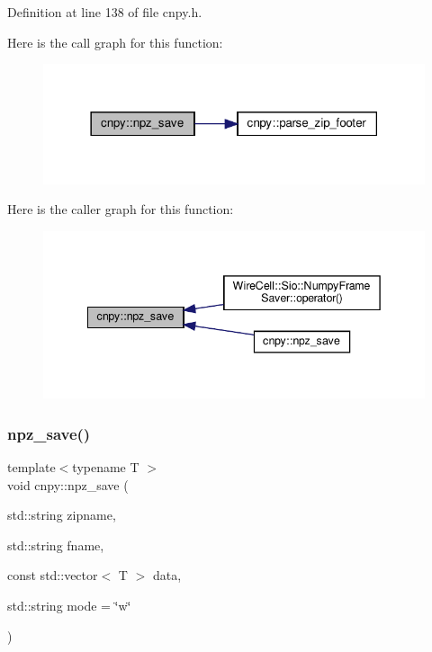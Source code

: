Definition at line 138 of file cnpy.\+h.

Here is the call graph for this function\+:
\nopagebreak
\begin{figure}[H]
\begin{center}
\leavevmode
\includegraphics[width=318pt]{namespacecnpy_acdeed7370a9ddc23ce3b66534e039a1f_cgraph}
\end{center}
\end{figure}
Here is the caller graph for this function\+:
\nopagebreak
\begin{figure}[H]
\begin{center}
\leavevmode
\includegraphics[width=342pt]{namespacecnpy_acdeed7370a9ddc23ce3b66534e039a1f_icgraph}
\end{center}
\end{figure}
\mbox{\label{namespacecnpy_a7161744ba1c204fea5c5e15b177a311f}} 
\subsubsection{\texorpdfstring{npz\+\_\+save()}{npz\_save()}\hspace{0.1cm}{\footnotesize\ttfamily [2/2]}}
{\footnotesize\ttfamily template$<$typename T $>$ \\
void cnpy\+::npz\+\_\+save (\begin{DoxyParamCaption}\item[{std\+::string}]{zipname,  }\item[{std\+::string}]{fname,  }\item[{const std\+::vector$<$ T $>$}]{data,  }\item[{std\+::string}]{mode = {\ttfamily \char`\"{}w\char`\"{}} }\end{DoxyParamCaption})}




